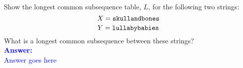 \item{}
Show the longest common subsequence table, $L$, for the following two strings:
$$X={\tt skullandbones}$$
$$Y={\tt lullabybabies}$$
What is a longest common subsequence between these strings?\\[12pt]
\ifanswers
\textcolor{blue}{
\textbf{Answer:}\\[6pt]
Answer goes here
}
\newpage
\fi
